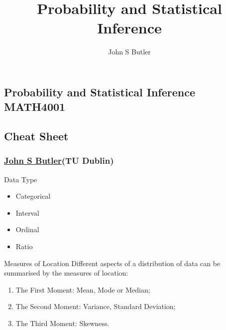 \documentclass[10pt,a4paper]{article}
\title{Probability and Statistical Inference}
\author{John S Butler }
\begin{document}
\small
\begin{multicols}{3}

\scriptsize


\section*{Probability and Statistical Inference \\ MATH4001}
\subsection*{Cheat Sheet}
\subsubsection*{\href{johnsbutler.netlify.com}{John S Butler}(TU Dublin) }

\begin{textbox}{Data Type}
\begin{multicols}{2}
\begin{itemize}
  \item Categorical
  \item Interval
  \item Ordinal
  \item Ratio
\end{itemize}

\end{multicols}

\end{textbox}


\begin{textbox}{Measures of Location}
Different aspects of a distribution of data can be summarised by the measures of location:
\begin{enumerate}
    \item The First Moment: Mean, Mode or Median;
    \item  The Second Moment: Variance, Standard Deviation;
    \item  The Third Moment: Skewness.
\end{enumerate}


\end{textbox}
\end{multicols}
\end{document}
